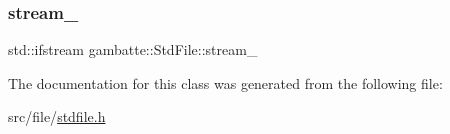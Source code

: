\mbox{\label{classgambatte_1_1StdFile_a8a29b037eee32db589450ae81acdb5b9}} 
\subsubsection{\texorpdfstring{stream\+\_\+}{stream\_}}
{\footnotesize\ttfamily std\+::ifstream gambatte\+::\+Std\+File\+::stream\+\_\+\hspace{0.3cm}{\ttfamily [private]}}



The documentation for this class was generated from the following file\+:\begin{DoxyCompactItemize}
\item 
src/file/\hyperlink{stdfile_8h}{stdfile.\+h}\end{DoxyCompactItemize}
